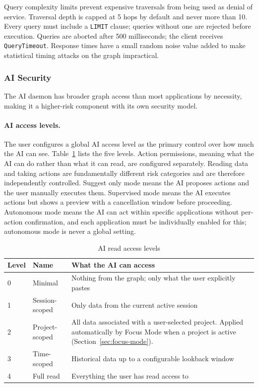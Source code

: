 Query complexity limits prevent expensive traversals from being used as denial
of service. Traversal depth is capped at 5 hops by default and never more than
10. Every query must include a \texttt{LIMIT} clause; queries without one are
rejected before execution. Queries are aborted after 500 milliseconds; the
client receives \texttt{QueryTimeout}. Response times have a small random
noise value added to make statistical timing attacks on the graph impractical.

\subsubsection{AI Security}
\label{sec:ai-security}

The AI daemon has broader graph access than most applications by necessity,
making it a higher-risk component with its own security model.

\paragraph{AI access levels.}
The user configures a global AI access level as the primary control over how
much the AI can see. Table~\ref{tab:ai-access} lists the five levels. Action
permissions, meaning what the AI can do rather than what it can read, are
configured separately. Reading data and taking actions are fundamentally
different risk categories and are therefore independently controlled. Suggest
only mode means the AI proposes actions and the user manually executes them.
Supervised mode means the AI executes actions but shows a preview with a
cancellation window before proceeding. Autonomous mode means the AI can act
within specific applications without per-action confirmation, and each
application must be individually enabled for this; autonomous mode is never a
global setting.

\begin{table}[htbp]
\caption{AI read access levels}
\label{tab:ai-access}
\begin{tabularx}{\linewidth}{llX}
\toprule
\textbf{Level} & \textbf{Name} & \textbf{What the AI can access} \\
\midrule
0 & Minimal       & Nothing from the graph; only what the user explicitly pastes \\
1 & Session-scoped & Only data from the current active session \\
2 & Project-scoped & All data associated with a user-selected project. Applied automatically by Focus Mode when a project is active (Section~\ref{sec:focus-mode}). \\
3 & Time-scoped   & Historical data up to a configurable lookback window \\
4 & Full read     & Everything the user has read access to \\
\bottomrule
\end{tabularx}
\end{table}

